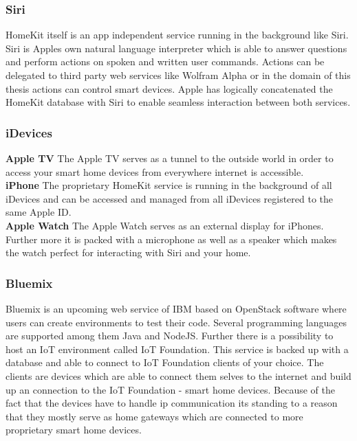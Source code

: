 		\subsubsection{Siri}
			HomeKit itself is an app independent service running in the background like Siri. Siri is Apples own natural language interpreter which is able to answer questions and perform actions on spoken and written user commands. Actions can be delegated to third party web services like Wolfram Alpha or in the domain of this thesis actions can control smart devices. Apple has logically concatenated the HomeKit database with Siri to enable seamless interaction between both services.\\

		\subsubsection{iDevices}

			\textbf{Apple TV}
				The Apple TV serves as a tunnel to the outside world in order to access your smart home devices from everywhere internet is accessible.\\

			\textbf{iPhone}
				The proprietary HomeKit service is running in the background of all iDevices and can be accessed and managed from all iDevices registered to the same Apple ID.\\ 

			\textbf{Apple Watch}
				The Apple Watch serves as an external display for iPhones. Further more it is packed with a microphone as well as a speaker which makes the watch perfect for interacting with Siri and your home.\\

		\subsubsection{Bluemix}
			Bluemix is an upcoming web service of IBM based on OpenStack software where users can create environments to test their code. Several programming languages are supported among them Java and NodeJS. Further there is a possibility to host an IoT environment called IoT Foundation. This service is backed up with a database and able to connect to IoT Foundation clients of your choice. The clients are devices which are able to connect them selves to the internet and build up an connection to the IoT Foundation - smart home devices. Because of the fact that the devices have to handle ip communication its standing to a reason that they mostly serve as home gateways which are connected to more proprietary smart home devices.\\

